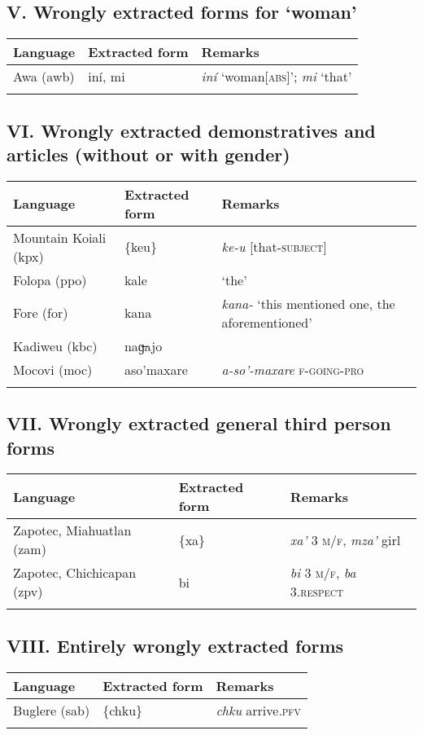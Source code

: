 \subsection*{V. Wrongly extracted forms for ‘woman’ \normalfont [1 language]}

\begin{tabularx}{\textwidth}{llQ}
\lsptoprule
 Language &  Extracted form &  Remarks \\
\midrule
Awa (awb)	 & {iní, mi}	 & \textit{iní} ‘woman[\textsc{abs}]’; \textit{mi} ‘that’\\
\lspbottomrule
\end{tabularx}


\subsection*{VI. Wrongly extracted demonstratives and articles (without or with gender)
\normalfont [5 languages]}

\begin{tabularx}{\textwidth}{llQ}
\lsptoprule
 Language &  Extracted form &  Remarks \\
\midrule
Mountain Koiali (kpx)	&	\{keu\}	&	\textit{ke-u} [that-\textsc{subject}]	\\
Folopa (ppo)	&	kale	&	‘the’	\\
Fore (for)	&	kana	&	\textit{kana-} ‘this mentioned one, the aforementioned’	\\
Kadiweu (kbc)	&	naɡ̶ajo	&		\\
Mocovi (moc)	&	aso’maxare	&	\textit{a-so’-maxare} \textsc{f-going-pro}	\\
\lspbottomrule
\end{tabularx}


\subsection*{VII. Wrongly extracted general third person forms \normalfont [2 languages]}

\begin{tabularx}{\textwidth}{llQ}
\lsptoprule
 Language &  Extracted form &  Remarks \\
\midrule
Zapotec, Miahuatlan (zam)	&	\{xa\textquotesingle{}\}	&	\textit{xa’} 3 \textsc{m/f}, \textit{mza’} girl	\\
Zapotec, Chichicapan (zpv)	&	bi	&	\textit{bi} 3 \textsc{m/f}, \textit{ba} 3.\textsc{respect}	\\
\lspbottomrule
\end{tabularx}


\subsection*{VIII. Entirely wrongly extracted forms}

\begin{tabularx}{\textwidth}{llQ}
\lsptoprule
 Language &  Extracted form &  Remarks \\
\midrule
Buglere (sab)	& \{chku\}	& \textit{chku} arrive.\textsc{pfv}\\
\lspbottomrule
\end{tabularx}
